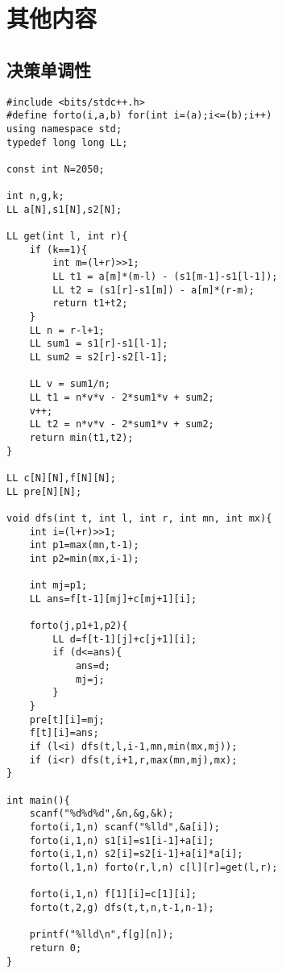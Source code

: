 \documentclass{article}
\begin{document}
\section{其他内容}

\subsection{决策单调性}
\begin{lstlisting}
#include <bits/stdc++.h>
#define forto(i,a,b) for(int i=(a);i<=(b);i++)
using namespace std;
typedef long long LL;

const int N=2050;

int n,g,k;
LL a[N],s1[N],s2[N];

LL get(int l, int r){
	if (k==1){
		int m=(l+r)>>1;
		LL t1 = a[m]*(m-l) - (s1[m-1]-s1[l-1]);
		LL t2 = (s1[r]-s1[m]) - a[m]*(r-m);
		return t1+t2;
	}
	LL n = r-l+1;
	LL sum1 = s1[r]-s1[l-1];
	LL sum2 = s2[r]-s2[l-1];
	
	LL v = sum1/n;
	LL t1 = n*v*v - 2*sum1*v + sum2;
	v++;
	LL t2 = n*v*v - 2*sum1*v + sum2;
	return min(t1,t2);
}

LL c[N][N],f[N][N];
LL pre[N][N];

void dfs(int t, int l, int r, int mn, int mx){
	int i=(l+r)>>1;
	int p1=max(mn,t-1);
	int p2=min(mx,i-1);
	
	int mj=p1;
	LL ans=f[t-1][mj]+c[mj+1][i];
		
	forto(j,p1+1,p2){
		LL d=f[t-1][j]+c[j+1][i];
		if (d<=ans){
			ans=d;
			mj=j;
		}
	}
	pre[t][i]=mj;
	f[t][i]=ans;
	if (l<i) dfs(t,l,i-1,mn,min(mx,mj));
	if (i<r) dfs(t,i+1,r,max(mn,mj),mx);
}

int main(){
	scanf("%d%d%d",&n,&g,&k);
	forto(i,1,n) scanf("%lld",&a[i]);
	forto(i,1,n) s1[i]=s1[i-1]+a[i];
	forto(i,1,n) s2[i]=s2[i-1]+a[i]*a[i];
	forto(l,1,n) forto(r,l,n) c[l][r]=get(l,r);
	
	forto(i,1,n) f[1][i]=c[1][i];
	forto(t,2,g) dfs(t,t,n,t-1,n-1);
	
	printf("%lld\n",f[g][n]);
	return 0;
}
\end{lstlisting}
\end{document}
